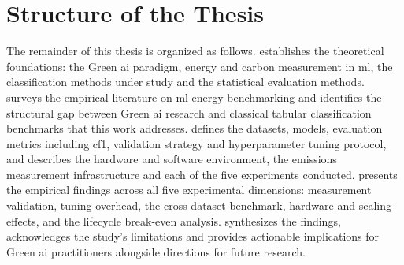 \section{Structure of the Thesis}
\label{sec:intro_structure}

The remainder of this thesis is organized as follows.  establishes the theoretical foundations: the Green \gls{ai} paradigm, energy and carbon measurement in \gls{ml}, the classification methods under study and the statistical evaluation methods.  surveys the empirical literature on \gls{ml} energy benchmarking and identifies the structural gap between Green \gls{ai} research and classical tabular classification benchmarks that this work addresses.  defines the datasets, models, evaluation metrics including \gls{cf1}, validation strategy and hyperparameter tuning protocol, and describes the hardware and software environment, the emissions measurement infrastructure and each of the five experiments conducted.  presents the empirical findings across all five experimental dimensions: measurement validation, tuning overhead, the cross-dataset benchmark, hardware and scaling effects, and the lifecycle break-even analysis.  synthesizes the findings, acknowledges the study's limitations and provides actionable implications for Green \gls{ai} practitioners alongside directions for future research.
